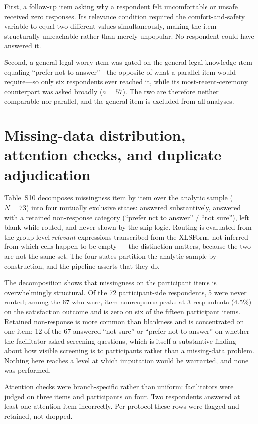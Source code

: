 \documentclass[12pt]{article}
\begin{document}
First, a follow-up item asking why a respondent felt uncomfortable or unsafe received zero responses. Its
relevance condition required the comfort-and-safety variable to equal two different values simultaneously,
making the item structurally unreachable rather than merely unpopular. No respondent could have answered
it.

Second, a general legal-worry item was gated on the general legal-knowledge item equaling ``prefer not to
answer''---the opposite of what a parallel item would require---so only six respondents ever reached it,
while its most-recent-ceremony counterpart was asked broadly ($n=57$). The two are therefore neither
comparable nor parallel, and the general item is excluded from all analyses.

\section{Missing-data distribution, attention checks, and duplicate adjudication}

Table~S10 decomposes missingness item by item over the analytic sample ($N=73$) into four mutually
exclusive states: answered substantively, answered with a retained non-response category (``prefer not
to answer'' / ``not sure''), left blank while routed, and never shown by the skip logic. Routing is
evaluated from the group-level \emph{relevant} expressions transcribed from the XLSForm, not inferred
from which cells happen to be empty --- the distinction matters, because the two are not the same set.
The four states partition the analytic sample by construction, and the pipeline asserts that they do.

The decomposition shows that missingness on the participant items is overwhelmingly structural. Of the
72 participant-side respondents, 5 were never routed; among the 67 who were, item nonresponse peaks at 3
respondents (4.5\%) on the satisfaction outcome and is zero on six of the fifteen participant items.
Retained non-response is more common than blankness and is concentrated on one item: 12 of the 67
answered ``not sure'' or ``prefer not to answer'' on whether the facilitator asked screening questions,
which is itself a substantive finding about how visible screening is to participants rather than a
missing-data problem. Nothing here reaches a level at which imputation would be warranted, and none was
performed.

Attention checks were branch-specific rather than uniform: facilitators were judged on three items and
participants on four. Two respondents answered at least one attention item incorrectly. Per protocol these
rows were flagged and retained, not dropped.
\end{document}
